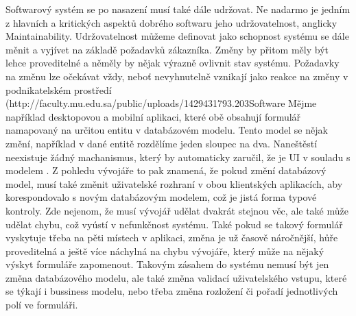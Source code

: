 Softwarový systém se po nasazení musí také dále udržovat. Ne nadarmo je jedním z hlavních a kritických aspektů dobrého softwaru jeho udržovatelnost, anglicky Maintainability. Udržovatelnost můžeme definovat jako schopnost systému se dále měnit a vyjívet na základě požadavků zákazníka. Změny by přitom měly být lehce proveditelné a něměly by nějak výrazně ovlivnit stav systému. Požadavky na změnu lze očekávat vždy, neboť nevyhnutelně vznikají jako reakce na změny v podnikatelském prostředí (http://faculty.mu.edu.sa/public/uploads/1429431793.203Software%
Mějme například desktopovou a mobilní aplikaci, které obě obsahují formulář namapovaný na určitou entitu v databázovém modelu. Tento model se nějak změní, například v dané entitě rozdělíme jeden sloupec na dva. Naneštěstí neexistuje žádný machanismus, který by automaticky zaručil, že je UI v souladu s modelem \cite{cernyTEA}. Z pohledu vývojáře to pak znamená, že pokud změní databázový model, musí také změnit uživatelské rozhraní v obou klientských aplikacích, aby korespondovalo s novým databázovým modelem, což je jistá forma typové kontroly. Zde nejenom, že musí vývojář udělat dvakrát stejnou věc, ale také může udělat chybu, což vyústí v nefunkčnost systému. Také pokud se takový formulář vyskytuje třeba na pěti místech v aplikaci, změna je už časově náročnější, hůře proveditelná a ještě více náchylná na chybu vývojáře, který může na nějaký výskyt formuláře zapomenout.
Takovým zásahem do systému nemusí být jen změna databázového modelu, ale také změna validací uživatelského vstupu, které se týkají i bussiness modelu, nebo třeba změna rozložení či pořadí jednotlivých polí ve formuláři.

